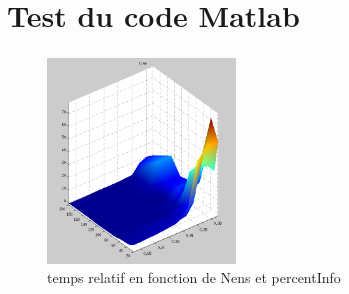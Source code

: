 \documentclass[slidetop,11pt]{beamer}
\begin{document}
\section{Test du code Matlab}
\begin{frame}
  \frametitle{}
  \begin{figure}
  \begin{center}
    \caption{temps relatif en fonction de Nens et percentInfo}
    \includegraphics[width=5cm]{time1.png}
  \end{center}
  \end{figure}
\end{frame}


\end{document}
